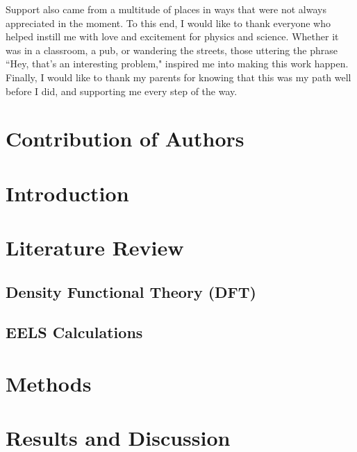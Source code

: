 \documentclass[12pt]{report}
\begin{document}
Support also came from a multitude of places in ways that were not always appreciated in the moment.  To this end, I would like to thank everyone who helped instill me with love and excitement for physics and science.  Whether it was in a classroom, a pub, or wandering the streets, those uttering the phrase ``Hey, that's an interesting problem," inspired me into making this work happen. Finally, I would like to thank my parents for knowing that this was my path well before I did, and supporting me every step of the way. 




\chapter*{Contribution of Authors}











\chapter{Introduction}
\renewcommand{\thepage}{\arabic{page}}%
\setcounter{page}{1}%




\chapter{Literature Review}\label{literature_review}

\section{Density Functional Theory (DFT)}\label{dft_section}

\section{EELS Calculations}\label{ELNES_section}

\chapter{Methods}\label{methods}

\chapter{Results and Discussion}\label{results}

\end{document}
